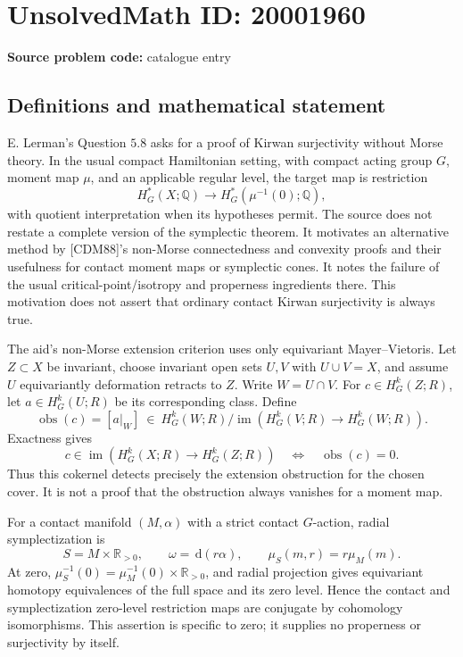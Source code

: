 \documentclass[11pt]{article}
\newcommand{\Q}{\mathbb{Q}}
\newcommand{\R}{\mathbb{R}}
\newcommand{\dd}{\,\mathrm{d}}
\begin{document}
\section*{UnsolvedMath ID: 20001960}
\textbf{Source problem code:} catalogue entry
\subsection{Definitions and mathematical statement}
E. Lerman's Question \(5.8\) asks for a proof of Kirwan surjectivity without Morse theory. In the usual compact Hamiltonian setting, with compact acting group \(G\), moment map \(\mu\), and an applicable regular level, the target map is restriction
\[
 H_G^*(X;\Q)\longrightarrow H_G^*(\mu^{-1}(0);\Q),
\]
with quotient interpretation when its hypotheses permit. The source does not restate a complete version of the symplectic theorem. It motivates an alternative method by [CDM88]'s non-Morse connectedness and convexity proofs and their usefulness for contact moment maps or symplectic cones. It notes the failure of the usual critical-point/isotropy and properness ingredients there. This motivation does not assert that ordinary contact Kirwan surjectivity is always true.

The aid's non-Morse extension criterion uses only equivariant Mayer--Vietoris. Let \(Z\subset X\) be invariant, choose invariant open sets \(U,V\) with \(U\cup V=X\), and assume \(U\) equivariantly deformation retracts to \(Z\). Write \(W=U\cap V\). For \(c\in H_G^k(Z;R)\), let \(a\in H_G^k(U;R)\) be its corresponding class. Define
\[
 \operatorname{obs}(c)=[a|_W]\ \in\
 H_G^k(W;R)/\operatorname{im}(H_G^k(V;R)\to H_G^k(W;R)).
\]
Exactness gives
\[
 c\in\operatorname{im}(H_G^k(X;R)\to H_G^k(Z;R))
 \quad\Longleftrightarrow\quad \operatorname{obs}(c)=0.
\]
Thus this cokernel detects precisely the extension obstruction for the chosen cover. It is not a proof that the obstruction always vanishes for a moment map.

For a contact manifold \((M,\alpha)\) with a strict contact \(G\)-action, radial symplectization is
\[
 S=M\times\R_{>0},\qquad \omega=\dd(r\alpha),\qquad
 \mu_S(m,r)=r\mu_M(m).
\]
At zero, \(\mu_S^{-1}(0)=\mu_M^{-1}(0)\times\R_{>0}\), and radial projection gives equivariant homotopy equivalences of the full space and its zero level. Hence the contact and symplectization zero-level restriction maps are conjugate by cohomology isomorphisms. This assertion is specific to zero; it supplies no properness or surjectivity by itself.
\end{document}
